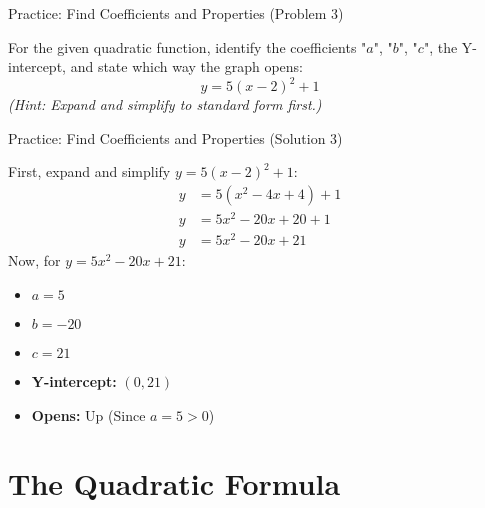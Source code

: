 \documentclass[aspectratio=169]{beamer}
\begin{document}
\begin{frame}{Practice: Find Coefficients and Properties (Problem 3)}
    \begin{tcolorbox}[colback=lightgray,colframe=primary,title=Problem 3]
        \footnotesize
        For the given quadratic function, identify the coefficients "$a$", "$b$", "$c$", the Y-intercept, and state which way the graph opens:\\
        \[ y = 5(x-2)^2 + 1 \]
        \textit{(Hint: Expand and simplify to standard form first.)}
    \end{tcolorbox}
\end{frame}

\begin{frame}{Practice: Find Coefficients and Properties (Solution 3)}
    \begin{tcolorbox}[colback=lightgray,colframe=accent,title=Solution 3]
        \footnotesize
        First, expand and simplify $y = 5(x-2)^2 + 1$:
        \begin{align*}
            y &= 5(x^2 - 4x + 4) + 1 \\
            y &= 5x^2 - 20x + 20 + 1 \\
            y &= 5x^2 - 20x + 21
        \end{align*}
        Now, for $y = 5x^2 - 20x + 21$:
        \begin{itemize}
            \item $a = 5$
            \item $b = -20$
            \item $c = 21$
            \item \textbf{Y-intercept:} $(0, 21)$
            \item \textbf{Opens:} Up (Since $a = 5 > 0$)
        \end{itemize}
    \end{tcolorbox}
\end{frame}


\section{The Quadratic Formula}
\end{document}
